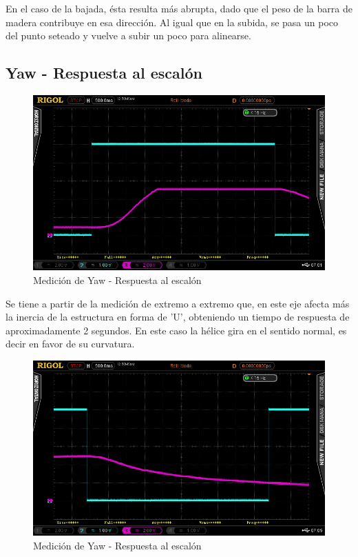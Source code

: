 \documentclass{article}
\begin{document}
En el caso de la bajada, ésta resulta más abrupta, dado que el peso de la barra de madera contribuye en esa dirección. Al igual que en la subida, se pasa un poco del punto seteado y vuelve a subir un poco para alinearse.

\subsection{Yaw - Respuesta al escalón}


\begin{figure}[H]
\centering
\includegraphics[width=0.8\linewidth]{images/escalonYaw.jpeg}\caption{Medición de Yaw - Respuesta al escalón}
\end{figure}

Se tiene a partir de la medición de extremo a extremo que, en este eje afecta más la inercia de la estructura en forma de 'U', obteniendo un tiempo de respuesta de aproximadamente 2 segundos. En este caso la hélice gira en el sentido normal, es decir en favor de su curvatura.

\begin{figure}[H]
\centering
\includegraphics[width=0.8\linewidth]{images/escalonInversoYAW.jpeg}\caption{Medición de Yaw - Respuesta al escalón}
\end{figure}
\end{document}

